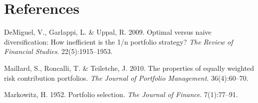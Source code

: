 \documentclass[11pt,preprint]{elsarticle}
\numberwithin{equation}{section}
\numberwithin{figure}{section}
\numberwithin{table}{section}
\newlength{\cslhangindent}
\newenvironment{CSLReferences}[2] %
{\begin{list}{}{%
	\setlength{\itemindent}{0pt}
	\setlength{\leftmargin}{0pt}
	\setlength{\parsep}{0pt}
	\ifodd #1
	\setlength{\leftmargin}{\cslhangindent}
	\setlength{\itemindent}{-1\cslhangindent}
	\fi
	\setlength{\itemsep}{#2\baselineskip}}}
{\end{list}}
\begin{document}
\newpage

\section*{References}\label{references}

\protect{}\label{refs}
\begin{CSLReferences}{1}{1}
DeMiguel, V., Garlappi, L. \& Uppal, R. 2009. Optimal versus naive
diversification: How inefficient is the 1/n portfolio strategy?
\emph{The Review of Financial Studies}. 22(5):1915--1953.

Maillard, S., Roncalli, T. \& Teiletche, J. 2010. The properties of
equally weighted risk contribution portfolios. \emph{The Journal of
Portfolio Management}. 36(4):60--70.

Markowitz, H. 1952. Portfolio selection. \emph{The Journal of Finance}.
7(1):77--91.

\end{CSLReferences}


\end{document}
